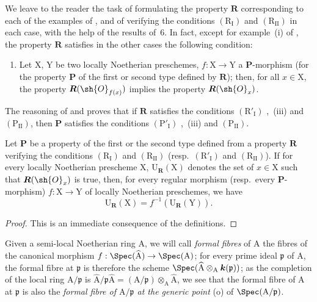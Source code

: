 \begin{remark}[7.3.11]
\label{IV.7.3.11}
We leave to the reader the task of formulating the property $\boldsymbol{R}$ corresponding to each of the examples of , and of verifying the conditions $(\mathrm{R_I})$ and $(\mathrm{R_{II}})$ in each case, with the help of the results of \textsection\,6.
In fact, except for example~(i) of , the property $\boldsymbol{R}$ satisfies in the other cases the following condition:
\begin{enumerate}
  \item[$(\mathrm{R}'_\mathrm{I})$] Let $\mathrm{X}$, $\mathrm{Y}$ be two locally Noetherian preschemes, $f:\mathrm{X}\to\mathrm{Y}$ a $\boldsymbol{P}$-morphism (for the property $\boldsymbol{P}$ of the first or second type defined by $\boldsymbol{R}$); then, for all $x\in\mathrm{X}$, the property $\boldsymbol{R}(\sh{O}_{f(x)})$ implies the property $\boldsymbol{R}(\sh{O}_x)$.
\end{enumerate}
The reasoning of  and  proves that if $\boldsymbol{R}$ satisfies the conditions $(\mathrm{R}'_\mathrm{I})$ ,~(iii) and $(\mathrm{P_{II}})$, then $\boldsymbol{P}$ satisfies the conditions $(\mathrm{P'_I})$ ,~(iii) and $(\mathrm{P_{II}})$.
\end{remark}

\begin{proposition}[7.3.12]
\label{IV.7.3.12}
Let $\boldsymbol{P}$ be a property of the first or the second type defined from a property $\boldsymbol{R}$ verifying the conditions $(\mathrm{R_I})$ and $(\mathrm{R_{II}})$ (resp.~$(\mathrm{R}'_\mathrm{I})$ and $(\mathrm{R_{II}})$).
If for every locally Noetherian prescheme $\mathrm{X}$, $\mathrm{U}_{\boldsymbol{R}}(\mathrm{X})$ denotes the set of $x\in\mathrm{X}$ such that $\boldsymbol{R}(\sh{O}_x)$ is true, then, for every regular morphism (resp.~every $\boldsymbol{P}$-morphism) $f:\mathrm{X}\to\mathrm{Y}$ of locally Noetherian preschemes, we have
\[
  \mathrm{U}_{\boldsymbol{R}}(\mathrm{X})=f^{-1}(\mathrm{U}_{\boldsymbol{R}}(\mathrm{Y})).
  \tag{7.3.12.1}
\]
\end{proposition}

\begin{proof}
This is an immediate consequence of the definitions.
\end{proof}

\begin{env}[7.3.13]
\label{IV.7.3.13}
Given a semi-local Noetherian ring $\mathrm{A}$, we will call \emph{formal fibres} of $\mathrm{A}$ the fibres of the canonical morphism $f:\Spec(\widehat{\mathrm{A}})\to\Spec(\mathrm{A})$; for every prime ideal $\mathfrak{p}$ of $\mathrm{A}$, the formal fibre at $\mathfrak{p}$ is therefore the scheme $\Spec(\widehat{\mathrm{A}}\otimes_\mathrm{A}\boldsymbol{k}(\mathfrak{p}))$; as the completion of the local ring $\mathrm{A}/\mathfrak{p}$ is $\widehat{\mathrm{A}}/\mathfrak{p}\widehat{\mathrm{A}}=(\mathrm{A}/\mathfrak{p})\otimes_\mathrm{A}\widehat{\mathrm{A}}$, we see that the formal fibre of $\mathrm{A}$ at $\mathfrak{p}$ is also the \emph{formal fibre of $\mathrm{A}/\mathfrak{p}$ at the generic point} (o) of $\Spec(\mathrm{A}/\mathfrak{p})$.
\end{env}

